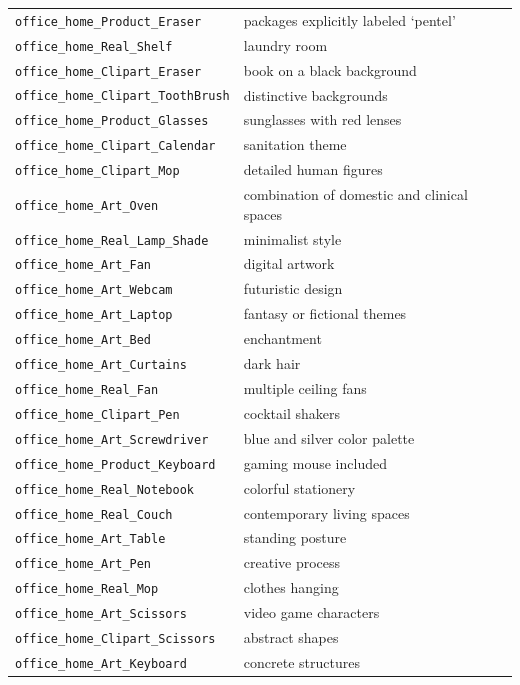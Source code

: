 \documentclass{article} %
\begin{document}
\begin{longtable}{p{} p{}}
\texttt{office\_home\_Product\_Eraser} & packages explicitly labeled `pentel' \\
\texttt{office\_home\_Real\_Shelf} & laundry room \\
\texttt{office\_home\_Clipart\_Eraser} & book on a black background \\
\texttt{office\_home\_Clipart\_ToothBrush} & distinctive backgrounds \\
\texttt{office\_home\_Product\_Glasses} & sunglasses with red lenses \\
\texttt{office\_home\_Clipart\_Calendar} & sanitation theme \\
\texttt{office\_home\_Clipart\_Mop} & detailed human figures \\
\texttt{office\_home\_Art\_Oven} & combination of domestic and clinical spaces \\
\texttt{office\_home\_Real\_Lamp\_Shade} & minimalist style \\
\texttt{office\_home\_Art\_Fan} & digital artwork \\
\texttt{office\_home\_Art\_Webcam} & futuristic design \\
\texttt{office\_home\_Art\_Laptop} & fantasy or fictional themes \\
\texttt{office\_home\_Art\_Bed} & enchantment \\
\texttt{office\_home\_Art\_Curtains} & dark hair \\
\texttt{office\_home\_Real\_Fan} & multiple ceiling fans \\
\texttt{office\_home\_Clipart\_Pen} & cocktail shakers \\
\texttt{office\_home\_Art\_Screwdriver} & blue and silver color palette \\
\texttt{office\_home\_Product\_Keyboard} & gaming mouse included \\
\texttt{office\_home\_Real\_Notebook} & colorful stationery \\
\texttt{office\_home\_Real\_Couch} & contemporary living spaces \\
\texttt{office\_home\_Art\_Table} & standing posture \\
\texttt{office\_home\_Art\_Pen} & creative process \\
\texttt{office\_home\_Real\_Mop} & clothes hanging \\
\texttt{office\_home\_Art\_Scissors} & video game characters \\
\texttt{office\_home\_Clipart\_Scissors} & abstract shapes \\
\texttt{office\_home\_Art\_Keyboard} & concrete structures \\

\end{longtable}
\end{document}
